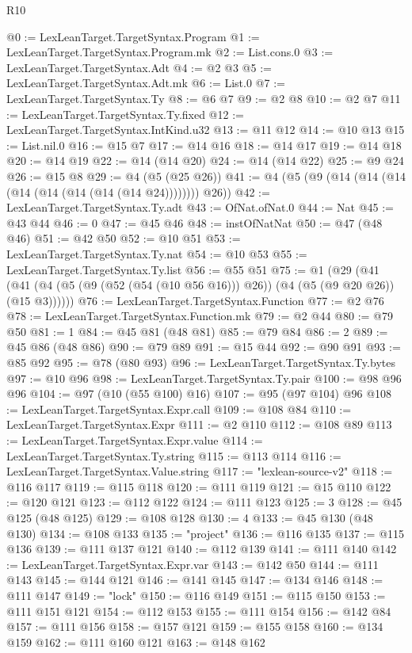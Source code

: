 \begin{lexlean}{R10}
\begin{coremodule}
@0 := LexLeanTarget.TargetSyntax.Program
@1 := LexLeanTarget.TargetSyntax.Program.mk
@2 := List.cons.{0}
@3 := LexLeanTarget.TargetSyntax.Adt
@4 := @2 @3
@5 := LexLeanTarget.TargetSyntax.Adt.mk
@6 := List.{0}
@7 := LexLeanTarget.TargetSyntax.Ty
@8 := @6 @7
@9 := @2 @8
@10 := @2 @7
@11 := LexLeanTarget.TargetSyntax.Ty.fixed
@12 := LexLeanTarget.TargetSyntax.IntKind.u32
@13 := @11 @12
@14 := @10 @13
@15 := List.nil.{0}
@16 := @15 @7
@17 := @14 @16
@18 := @14 @17
@19 := @14 @18
@20 := @14 @19
@22 := @14 (@14 @20)
@24 := @14 (@14 @22)
@25 := @9 @24
@26 := @15 @8
@29 := @4 (@5 (@25 @26))
@41 := @4 (@5 (@9 (@14 (@14 (@14 (@14 (@14 (@14 (@14 (@14 @24)))))))) @26))
@42 := LexLeanTarget.TargetSyntax.Ty.adt
@43 := OfNat.ofNat.{0}
@44 := Nat
@45 := @43 @44
@46 := 0
@47 := @45 @46
@48 := instOfNatNat
@50 := @47 (@48 @46)
@51 := @42 @50
@52 := @10 @51
@53 := LexLeanTarget.TargetSyntax.Ty.nat
@54 := @10 @53
@55 := LexLeanTarget.TargetSyntax.Ty.list
@56 := @55 @51
@75 := @1
    (@29 (@41 (@41 (@4 (@5 (@9 (@52 (@54 (@10 @56 @16))) @26)) (@4 (@5 (@9 @20 @26)) (@15 @3))))))
@76 := LexLeanTarget.TargetSyntax.Function
@77 := @2 @76
@78 := LexLeanTarget.TargetSyntax.Function.mk
@79 := @2 @44
@80 := @79 @50
@81 := 1
@84 := @45 @81 (@48 @81)
@85 := @79 @84
@86 := 2
@89 := @45 @86 (@48 @86)
@90 := @79 @89
@91 := @15 @44
@92 := @90 @91
@93 := @85 @92
@95 := @78 (@80 @93)
@96 := LexLeanTarget.TargetSyntax.Ty.bytes
@97 := @10 @96
@98 := LexLeanTarget.TargetSyntax.Ty.pair
@100 := @98 @96 @96
@104 := @97 (@10 (@55 @100) @16)
@107 := @95 (@97 @104) @96
@108 := LexLeanTarget.TargetSyntax.Expr.call
@109 := @108 @84
@110 := LexLeanTarget.TargetSyntax.Expr
@111 := @2 @110
@112 := @108 @89
@113 := LexLeanTarget.TargetSyntax.Expr.value
@114 := LexLeanTarget.TargetSyntax.Ty.string
@115 := @113 @114
@116 := LexLeanTarget.TargetSyntax.Value.string
@117 := "lexlean-source-v2"
@118 := @116 @117
@119 := @115 @118
@120 := @111 @119
@121 := @15 @110
@122 := @120 @121
@123 := @112 @122
@124 := @111 @123
@125 := 3
@128 := @45 @125 (@48 @125)
@129 := @108 @128
@130 := 4
@133 := @45 @130 (@48 @130)
@134 := @108 @133
@135 := "project"
@136 := @116 @135
@137 := @115 @136
@139 := @111 @137 @121
@140 := @112 @139
@141 := @111 @140
@142 := LexLeanTarget.TargetSyntax.Expr.var
@143 := @142 @50
@144 := @111 @143
@145 := @144 @121
@146 := @141 @145
@147 := @134 @146
@148 := @111 @147
@149 := "lock"
@150 := @116 @149
@151 := @115 @150
@153 := @111 @151 @121
@154 := @112 @153
@155 := @111 @154
@156 := @142 @84
@157 := @111 @156
@158 := @157 @121
@159 := @155 @158
@160 := @134 @159
@162 := @111 @160 @121
@163 := @148 @162

\end{coremodule}
\end{lexlean}
